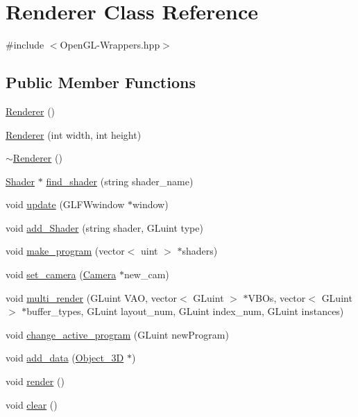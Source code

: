 \hypertarget{classRenderer}{}\section{Renderer Class Reference}
\label{classRenderer}


{\ttfamily \#include $<$Open\+G\+L-\/\+Wrappers.\+hpp$>$}

\subsection*{Public Member Functions}
\begin{DoxyCompactItemize}
\item 
\mbox{\hyperlink{classRenderer_a7ebf46f54dab9905f79b80f7fddb76a6}{Renderer}} ()
\item 
\mbox{\hyperlink{classRenderer_af72dee9cedcc9e481dd3d313bac11b62}{Renderer}} (int width, int height)
\item 
\mbox{\hyperlink{classRenderer_afeee408862d5bd6255a6882d47e6d5cd}{$\sim$\+Renderer}} ()
\item 
\mbox{\hyperlink{classShader}{Shader}} $\ast$ \mbox{\hyperlink{classRenderer_a77793f47d57b7b07f0f1ad7c4cad809e}{find\+\_\+shader}} (string shader\+\_\+name)
\item 
void \mbox{\hyperlink{classRenderer_a34ac63c7fe0611ece146dc504aecb815}{update}} (G\+L\+F\+Wwindow $\ast$window)
\item 
void \mbox{\hyperlink{classRenderer_ad8ac6bc8ebf20e8973bd0defb7f93cdb}{add\+\_\+\+Shader}} (string shader, G\+Luint type)
\item 
void \mbox{\hyperlink{classRenderer_a25a35d48716bd7c096f90cc5eabc2fc6}{make\+\_\+program}} (vector$<$ uint $>$ $\ast$shaders)
\item 
void \mbox{\hyperlink{classRenderer_a6d8650dd5617e17865aaab8ce409642b}{set\+\_\+camera}} (\mbox{\hyperlink{classCamera}{Camera}} $\ast$new\+\_\+cam)
\item 
void \mbox{\hyperlink{classRenderer_aa0941d2b58991dabe9231ee2c657c36f}{multi\+\_\+render}} (G\+Luint V\+AO, vector$<$ G\+Luint $>$ $\ast$V\+B\+Os, vector$<$ G\+Luint $>$ $\ast$buffer\+\_\+types, G\+Luint layout\+\_\+num, G\+Luint index\+\_\+num, G\+Luint instances)
\item 
void \mbox{\hyperlink{classRenderer_a8006d28ad24998ab34e740aa6479e86f}{change\+\_\+active\+\_\+program}} (G\+Luint new\+Program)
\item 
void \mbox{\hyperlink{classRenderer_acdc6907bf1aaf90fe7e11e29f3b6de20}{add\+\_\+data}} (\mbox{\hyperlink{classObject__3D}{Object\+\_\+3D}} $\ast$)
\item 
void \mbox{\hyperlink{classRenderer_af7e5f8f68742f198e315fb4683a605a4}{render}} ()
\item 
void \mbox{\hyperlink{classRenderer_ac46720b3fc0dbb2fc37674766490a8c4}{clear}} ()
\end{DoxyCompactItemize}

